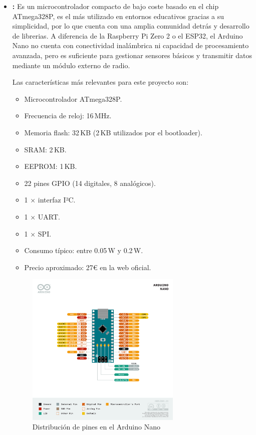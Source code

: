 \begin{itemize}
    \item \textbf{\cite{arduino_nano}:}
    Es un microcontrolador compacto de bajo coste basado en el chip ATmega328P, es el más utilizado en entornos educativos gracias a su simplicidad,
    por lo que cuenta con una amplia comunidad detrás y desarrollo de librerias.
    A diferencia de la Raspberry Pi Zero 2 o el ESP32, el Arduino Nano no cuenta con conectividad inalámbrica ni capacidad de procesamiento avanzada,
    pero es suficiente para gestionar sensores básicos y transmitir datos mediante un módulo externo de radio.

    Las características más relevantes para este proyecto son:
    \begin{itemize}
        \item Microcontrolador ATmega328P.
        \item Frecuencia de reloj: 16\,MHz.
        \item Memoria flash: 32\,KB (2\,KB utilizados por el bootloader).
        \item SRAM: 2\,KB.
        \item EEPROM: 1\,KB.
        \item 22 pines GPIO (14 digitales, 8 analógicos).
        \item 1 × interfaz I²C.
        \item 1 × UART.
        \item 1 × SPI.
        \item Consumo típico: entre 0.05\,W y 0.2\,W.
        \item Precio aproximado: 27€ en la web oficial.
    \end{itemize}

    \begin{figure}[h]
        \centering
        \includegraphics[width=0.7\textwidth]{Imagenes/Bitmap/arduinoNanogpio}
        \caption{Distribución de pines en el Arduino Nano}
        \label{fig:arduino_nano_gpio}
    \end{figure}


\end{itemize}
